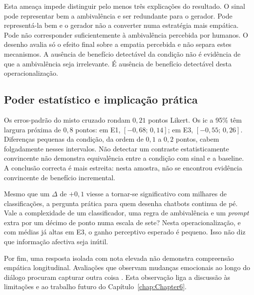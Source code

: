Esta ameaça impede distinguir pelo menos três explicações do resultado. O sinal pode representar bem a ambivalência e ser redundante para o gerador. Pode representá-la bem e o gerador não a converter numa estratégia mais empática. Pode não corresponder suficientemente à ambivalência percebida por humanos. O desenho avalia só o efeito final sobre a empatia percebida e não separa estes mecanismos. A ausência de benefício detectável da condição não é evidência de que a ambivalência seja irrelevante. É ausência de benefício detectável desta operacionalização.

\subsection{Poder estatístico e implicação prática}
\label{subsec:disc_poder}

Os erros-padrão do misto cruzado rondam \(0{,}21\) pontos Likert. Os \gls{ic} a 95\% têm largura próxima de \(0{,}8\) pontos: em E1, \([-0{,}68;\,0{,}14]\); em E3, \([-0{,}55;\,0{,}26]\). Diferenças pequenas da condição, da ordem de \(0{,}1\) a \(0{,}2\) pontos, cabem folgadamente nesses intervalos. Não detectar um contraste estatisticamente convincente não demonstra equivalência entre a condição com sinal e a baseline. A conclusão correcta é mais estreita: nesta amostra, não se encontrou evidência convincente de benefício incremental.

Mesmo que um \(\Delta\) de \(+0{,}1\) viesse a tornar-se significativo com milhares de classificações, a pergunta prática para quem desenha chatbots continua de pé. Vale a complexidade de um classificador, uma regra de ambivalência e um \textit{prompt} extra por um décimo de ponto numa escala de sete? Nesta operacionalização, e com médias já altas em E3, o ganho perceptivo esperado é pequeno. Isso não diz que informação afectiva seja inútil.

Por fim, uma resposta isolada com nota elevada não demonstra compreensão empática longitudinal. Avaliações que observam mudanças emocionais ao longo do diálogo procuram capturar outra coisa \parencite{Zhang2026SAGE}. Esta observação liga a discussão às limitações e ao trabalho futuro do Capítulo~\ref{chap:Chapter6}.

